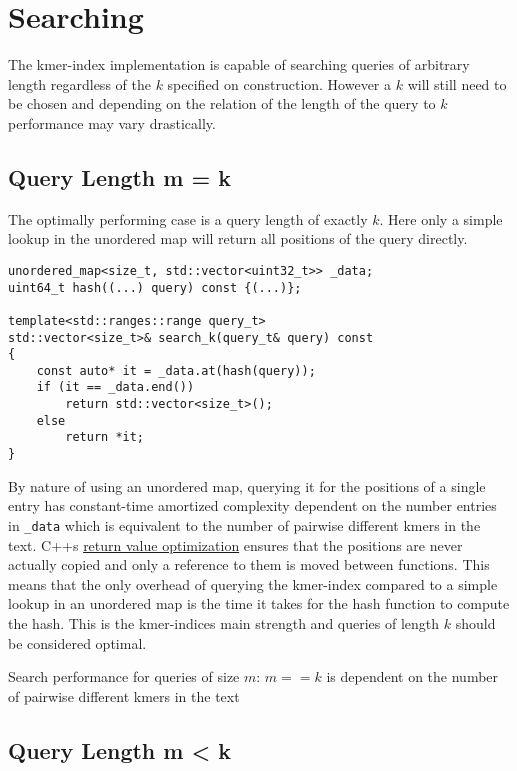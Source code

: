 \section{Searching}

The kmer-index implementation is capable of searching queries of arbitrary length regardless of the $k$ specified on
construction. However a $k$ will still need to be chosen and depending on the relation of the length of the query to $k$
performance may vary drastically.

\subsection{Query Length m = k}

The optimally performing case is a query length of exactly $k$. Here only a simple lookup in the unordered map will
return all positions of the query directly.
\begin{lstlisting}[caption={Search function for queries of size k.},language={[GNU]C++},tabsize=4]
unordered_map<size_t, std::vector<uint32_t>> _data;
uint64_t hash((...) query) const {(...)};

template<std::ranges::range query_t>
std::vector<size_t>& search_k(query_t& query) const
{
	const auto* it = _data.at(hash(query));
	if (it == _data.end())
		return std::vector<size_t>();
	else
		return *it;
}
\end{lstlisting}

By nature of using an unordered map, querying it for the positions of a single entry has constant-time amortized complexity
dependent on the number entries in \lstinline{_data} which is equivalent to the number of pairwise different kmers in the text. C++s
\href{https://en.cppreference.com/w/cpp/language/copy_elision}{return value optimization} ensures that the positions are
never actually copied and only a reference to them is moved between functions. This means that the only overhead of querying
the kmer-index compared to a simple lookup in an unordered map is the time it takes for the hash function
to compute the hash. This is the kmer-indices main strength and queries of length $k$ should be considered optimal.

\begin{lem}
\label{Lemma 1}
Search performance for queries of size $m:\,m==k$ is dependent on the number of pairwise different kmers in the text
\end{lem}

\subsection{Query Length m < k}

